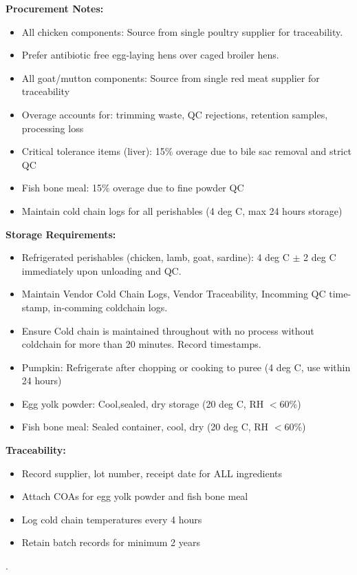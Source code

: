 \textbf{Procurement Notes:}
\begin{itemize}
\item All chicken components: Source from single poultry supplier for traceability. 
\item Prefer antibiotic free egg-laying hens over caged broiler hens. 
\item All goat/mutton components: Source from single red meat supplier for traceability
\item Overage accounts for: trimming waste, QC rejections, retention samples, processing loss
\item Critical tolerance items (liver): 15\% overage due to bile sac removal and strict QC
\item Fish bone meal: 15\% overage due to fine powder QC
\item Maintain cold chain logs for all perishables (4 deg C, max 24 hours storage)
\end{itemize}

\textbf{Storage Requirements:}
\begin{itemize}
\item Refrigerated perishables (chicken, lamb, goat, sardine): 4 deg C $\pm$ 2 deg C immediately upon unloading and QC. 
\item Maintain Vendor Cold Chain Logs, Vendor Traceability, Incomming QC time-stamp, in-comming coldchain logs.
\item Ensure Cold chain is maintained throughout with no process without coldchain for more than 20 minutes. Record timestamps. 
\item Pumpkin: Refrigerate after chopping or cooking to puree (4 deg C, use within 24 hours)
\item Egg yolk powder: Cool,sealed, dry storage (20 deg C, RH $<$60\%)
\item Fish bone meal: Sealed container, cool, dry (20 deg C, RH $<$60\%)

\end{itemize}

\textbf{Traceability:}
\begin{itemize}
\item Record supplier, lot number, receipt date for ALL ingredients
\item Attach COAs for egg yolk powder and fish bone meal
\item Log cold chain temperatures every 4 hours
\item Retain batch records for minimum 2 years
\end{itemize}.